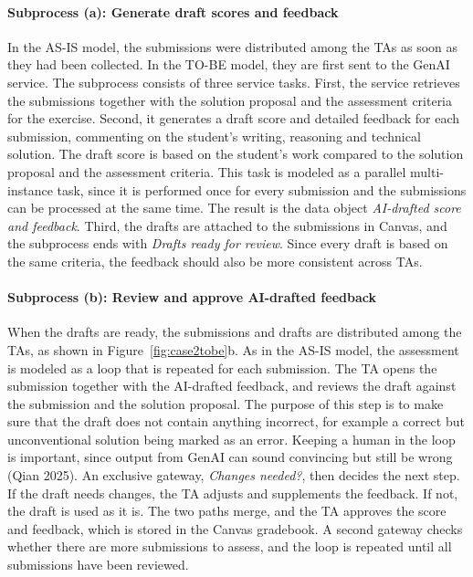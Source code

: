 \paragraph{Subprocess (a): Generate draft scores and feedback} 
In the AS-IS model, the submissions were distributed among the TAs as soon as they had been collected. In the TO-BE model, they are first sent to the GenAI service. The subprocess consists of three service tasks. First, the service retrieves the submissions together with the solution proposal and the assessment criteria for the exercise. Second, it generates a draft score and detailed feedback for each submission, commenting on the student's writing, reasoning and technical solution. The draft score is based on the student's work compared to the solution proposal and the assessment criteria. This task is modeled as a parallel multi-instance task, since it is performed once for every submission and the submissions can be processed at the same time. The result is the data object \textit{AI-drafted score and feedback}. Third, the drafts are attached to the submissions in Canvas, and the subprocess ends with \textit{Drafts ready for review}. Since every draft is based on the same criteria, the feedback should also be more consistent across TAs.

\paragraph{Subprocess (b): Review and approve AI-drafted feedback} When the drafts are ready, the submissions and drafts are distributed among the TAs, as shown in Figure~\ref{fig:case2tobe}b. As in the AS-IS model, the assessment is modeled as a loop that is repeated for each submission. The TA opens the submission together with the AI-drafted feedback, and reviews the draft against the submission and the solution proposal. The purpose of this step is to make sure that the draft does not contain anything incorrect, for example a correct but unconventional solution being marked as an error. Keeping a human in the loop is important, since output from GenAI can sound convincing but still be wrong (Qian 2025). An exclusive gateway, \textit{Changes needed?}, then decides the next step. If the draft needs changes, the TA adjusts and supplements the feedback. If not, the draft is used as it is. The two paths merge, and the TA approves the score and feedback, which is stored in the Canvas gradebook. A second gateway checks whether there are more submissions to assess, and the loop is repeated until all submissions have been reviewed.

